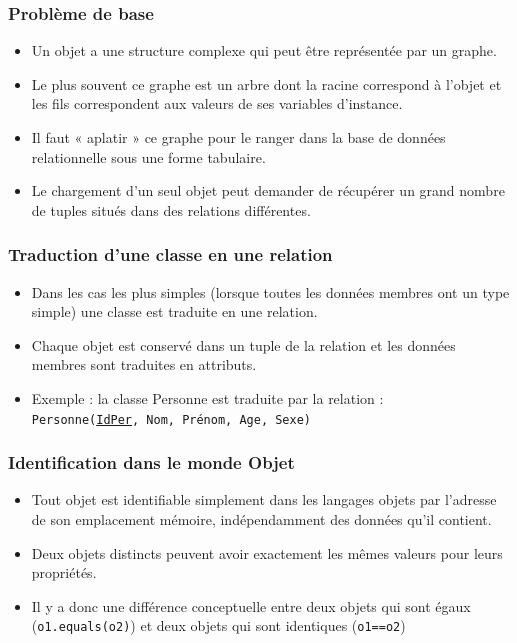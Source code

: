 \documentclass[xcolor=pdftex,x11names,table]{beamer}
\begin{document}
   	\begin{frame}
    \frametitle{Problème de base}
		  \begin{itemize}
		  	\item Un objet a une structure complexe qui peut être représentée par un graphe.
		  	\item Le plus souvent ce graphe est un arbre dont la racine correspond à l’objet et les fils correspondent aux 
		  	valeurs de ses variables d’instance.
		  	\item Il faut « aplatir » ce graphe pour le ranger dans la base de données relationnelle sous une forme tabulaire.
		  	\item Le chargement d'un seul objet peut demander de récupérer un grand nombre de tuples situés dans des 
		  	relations différentes.
		  \end{itemize}	
   	\end{frame}

   	\begin{frame}
    \frametitle{Traduction d’une classe en une relation}
		  \begin{itemize}
		  	\item Dans les cas les plus simples (lorsque toutes les données membres ont un type simple) une classe est 
		  	traduite en une relation.
		  	\item Chaque objet est conservé dans un tuple de la relation et les données membres sont traduites en attributs.
		  	\item Exemple : la classe Personne est traduite par la relation : \\ \texttt{Personne(\underline{IdPer}, Nom, Prénom, Age, Sexe)} 
		  \end{itemize}	
		  
		  \begin{center}
			\end{center}
   	\end{frame}


   	\begin{frame}
    \frametitle{Identification dans le monde Objet}
		  \begin{itemize}
		  	\item Tout objet est identifiable simplement dans les langages objets par l'adresse de son emplacement mémoire, 
		  	indépendamment des données qu’il contient. 
		  	\item Deux objets distincts peuvent avoir exactement les mêmes valeurs pour leurs propriétés.
		  	\item Il y a donc une différence conceptuelle entre deux objets qui sont égaux (\lstinline$o1.equals(o2)$) et deux objets 
		  	qui sont identiques (\lstinline$o1==o2$)
		  \end{itemize}	
   	\end{frame}
\end{document}
